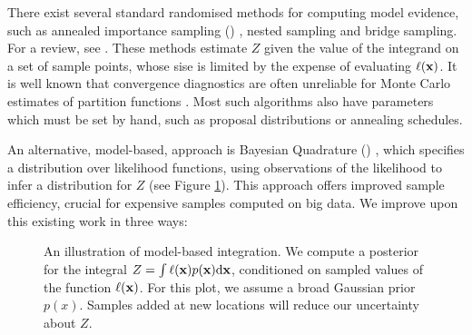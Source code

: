 \documentclass{article} %
\begin{document}

There exist several standard randomised methods for computing model evidence, such as annealed importance sampling () \cite{neal2001annealed}, nested sampling \cite{skilling2004nested} and bridge sampling.  For a review, see \cite{chen2000monte}.   These methods estimate $Z$ given the value of the integrand on a set of sample points, whose sise is limited by the expense of evaluating $\ell(\vlfv)$.  It is well known that convergence diagnostics are often unreliable for Monte Carlo estimates of partition functions  \cite{NealMC, brooks1998convergence, cowles1999possible}.  Most such algorithms also have parameters which must be set by hand, such as proposal distributions or annealing schedules.


An alternative, model-based, approach is Bayesian Quadrature () \cite{stanford1986bayesian, BZHermiteQuadrature, BZMonteCarlo}, which specifies a distribution over likelihood functions, using observations of the likelihood to infer a distribution for $Z$ (see Figure \ref{fig:model_based}). This approach offers improved sample efficiency, crucial for expensive samples computed on big data. We improve upon this existing work in three ways:

\begin{figure}
\centering
{}
\caption{An illustration of model-based integration.  We compute a posterior for the integral $Z = \int \lfn(\vlfv) p(\vlfv) \ud\vlfv$, conditioned on sampled values of the function $\lfn(\vlfv)$. For this plot, we assume a broad Gaussian prior $p(x)$. Samples added at new locations will reduce our uncertainty about $Z$.}
\label{fig:model_based}
\end{figure}
\end{document}
